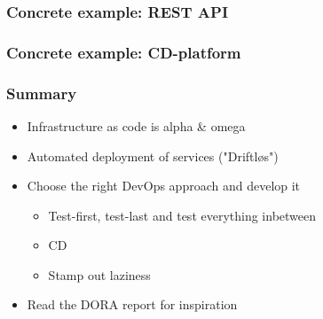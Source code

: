 \documentclass{beamer}
\begin{document}
\begin{frame}
\frametitle{Concrete example: REST API}
\end{frame}

\begin{frame}
\frametitle{Concrete example: CD-platform}
\end{frame}

\begin{frame}
\frametitle{Summary}
\begin{itemize}
  \item Infrastructure as code is alpha \& omega
  \item Automated deployment of services ("Driftløs")
  \item Choose the right DevOps approach and develop it
  \begin{itemize}
    \item Test-first, test-last and test everything inbetween
    \item CD
    \item Stamp out laziness
  \end{itemize}
  \item Read the DORA report for inspiration
\end{itemize}
\end{frame}
\end{document}
